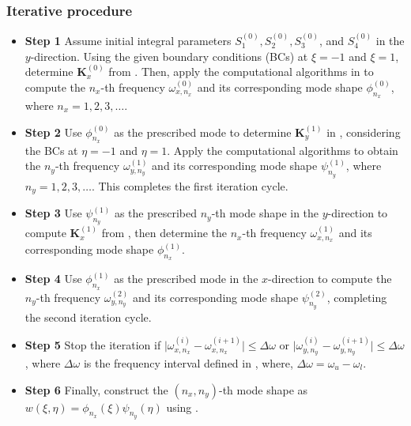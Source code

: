 \documentclass[preprint,12pt]{elsarticle}
\begin{document}
\subsubsection{Iterative procedure}\label{sec:Iterative_procedure}
\begin{itemize}[]
	\item \textbf{Step 1} Assume initial integral parameters \(S^{(0)}_1, S^{(0)}_2, S^{(0)}_3\), and \(S^{(0)}_4\) in the \(y\)-direction. Using the given boundary conditions (BCs) at \(\xi = -1\) and \(\xi = 1\), determine \(\mathbf{K}^{(0)}_x\) from . Then, apply the computational algorithms in  to compute the \(n_x\)-th frequency \(\omega^{(0)}_{x,n_x}\) and its corresponding mode shape \(\phi^{(0)}_{n_x}\), where \(n_x = 1, 2, 3, \ldots\).  
	
	\item \textbf{Step 2} Use \(\phi^{(0)}_{n_x}\) as the prescribed mode to determine \(\mathbf{K}^{(1)}_y\) in , considering the BCs at \(\eta = -1\) and \(\eta = 1\). Apply the computational algorithms to obtain the \(n_y\)-th frequency \(\omega^{(1)}_{y,n_y}\) and its corresponding mode shape \(\psi^{(1)}_{n_y}\), where \(n_y = 1, 2, 3, \ldots\). This completes the first iteration cycle.  
	
	\item \textbf{Step 3} Use \(\psi^{(1)}_{n_y}\) as the prescribed \(n_y\)-th mode shape in the \(y\)-direction to compute \(\mathbf{K}^{(1)}_x\) from , then determine the \(n_x\)-th frequency \(\omega^{(1)}_{x,n_x}\) and its corresponding mode shape \(\phi^{(1)}_{n_x}\).  
	
	\item \textbf{Step 4} Use \(\phi^{(1)}_{n_x}\) as the prescribed mode in the \(x\)-direction to compute the \(n_y\)-th frequency \(\omega^{(2)}_{y,n_y}\) and its corresponding mode shape \(\psi^{(2)}_{n_y}\), completing the second iteration cycle.  
	
	\item \textbf{Step 5} Stop the iteration if \(\mid\omega^{(i)}_{x,n_x} - \omega^{(i+1)}_{x,n_x}\mid \leq \Delta\omega\) or \(\mid\omega^{(i)}_{y,n_y} - \omega^{(i+1)}_{y,n_y}\mid \leq \Delta\omega\), where \(\Delta\omega\) is the frequency interval defined in , where, \(\Delta\omega = \omega_u - \omega_l\).  
	
	\item \textbf{Step 6} Finally, construct the \((n_x, n_y)\)-th mode shape as \(w(\xi, \eta) = \phi_{n_x}(\xi) \psi_{n_y}(\eta)\) using .  
\end{itemize}
\end{document}
